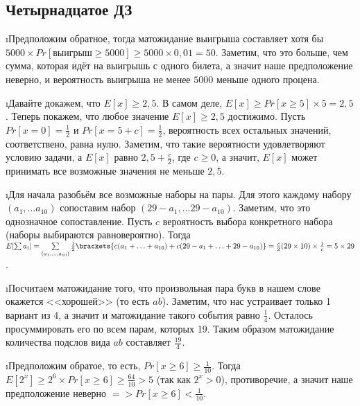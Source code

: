 \subsection{Четырнадцатое ДЗ}


\i Предположим обратное, тогда матожидание выигрыша составляет хотя бы $5000 \times Pr[\text{выигрыш} \geq 5000] \geq 5000 \times 0{,}01 = 50$. Заметим, что это больше, чем сумма, которая идёт на выигрышь с одного билета, а значит наше предположение неверно, и вероятность выигрыша не менее $5000$ меньше одного процена.

\i Давайте докажем, что $E[x] \geq 2{,}5$. В самом деле, $E[x] \geq Pr[x \geq 5] \times 5 = 2{,}5$. Теперь покажем, что любое значение $E[x] \geq 2{,}5$ достижимо. Пусть $Pr[x = 0] = \frac{1}{2}$ и $Pr[x = 5+c] = \frac{1}{2}$, вероятность всех остальных значений, соответствено, равна нулю. Заметим, что такие вероятности удовлетворяют условию задачи, а $E[x]$ равно $2{,}5 + \frac{c}{2}$, где $c \geq 0$, а значит, $E[x]$ может принимать все возможные значения не меньше $2{,}5$.

\i Для начала разобьём все возможные наборы на пары. Для этого каждому набору $(a_1, \ldots a_{10})$ сопоставим набор $(29-a_1, \ldots 29-a_{10})$. Заметим, что это однозначное сопоставление. Пусть $c$ вероятность выбора конкретного набора (наборы выбираются равновероятно). Тогда $E[\sum a_i] = \sum\limits_{(a_1, \ldots, a_{10})}\frac{1}{2}\brackets{c(a_1 + \ldots + a_{10}) + c(29-a_1 + \ldots + 29-a_{10})} = \frac{c}{2}(29\times 10)\times \frac{1}{c} = 5\times29$.

\i Посчитаем матожидание того, что произвольная пара букв в нашем слове окажется <<хорошей>> (то есть $ab$). Заметим, что нас устраивает только 1 вариант из 4, а значит и матожидание такого события равно $\frac{1}{4}$. Осталось просуммировать его по всем парам, которых 19. Таким образом матожидание количества подслов вида $ab$ составляет $\frac{19}{4}$.

\i Предположим обратое, то есть, $Pr[x \geq 6] \geq \frac{1}{10}$. Тогда $E[2^x] \geq 2^6 \times Pr[x \geq 6] \geq \frac{64}{10} > 5$ (так как $2^x > 0$), противоречие, а значит наше предположение неверно $=> Pr[x \geq 6] < \frac{1}{10}$. 


